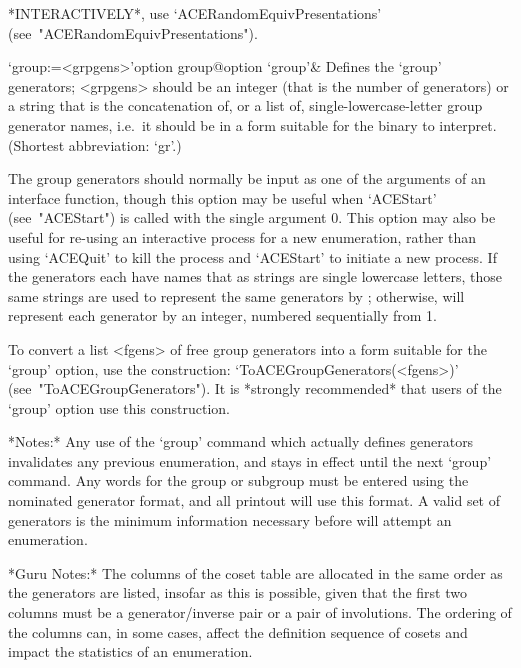 *INTERACTIVELY*,           use           `ACERandomEquivPresentations'
(see~"ACERandomEquivPresentations").

\enditems


\beginitems

\>`group:=<grpgens>'{option group}@{option `group'}&
Defines the `group' generators; <grpgens> should be an  integer  (that
is the number of generators) or a string that is the concatenation of,
or a list of, single-lowercase-letter group generator  names,  i.e.~it
should be in a form suitable  for  the  {\ACE}  binary  to  interpret.
(Shortest abbreviation: `gr'.)

The group generators should normally be input as one of the  arguments
of an {\ACE} interface function, though this option may be useful when
`ACEStart' (see~"ACEStart") is called with the single argument 0. This
option may also be useful for re-using an interactive  process  for  a
new enumeration, rather than using `ACEQuit' to kill the  process  and
`ACEStart' to initiate a new process.  If  the  generators  each  have
names that as strings are single lowercase letters, those same strings
are used to represent the same generators by {\ACE}; otherwise, {\ACE}
will represent each generator by  an  integer,  numbered  sequentially
from 1.

To convert a {\GAP} list <fgens> of free group generators into a  form
suitable   for   the   `group'   option,   use    the    construction:
`ToACEGroupGenerators(<fgens>)'  (see~"ToACEGroupGenerators").  It  is
*strongly recommended* that users  of  the  `group'  option  use  this
construction.

*Notes:*
Any use of the  `group'  command  which  actually  defines  generators
invalidates any previous enumeration, and stays in  effect  until  the
next `group' command. Any words for the  group  or  subgroup  must  be
entered using the nominated generator format, and  all  printout  will
use this format. A valid set of generators is the minimum  information
necessary before {\ACE} will attempt an enumeration.

*Guru Notes:*
The columns of the coset table are allocated in the same order as  the
generators are listed, insofar as this is  possible,  given  that  the
first two columns must be  a  generator/inverse  pair  or  a  pair  of
involutions. The ordering of the columns can, in  some  cases,  affect
the definition sequence of cosets and  impact  the  statistics  of  an
enumeration.

